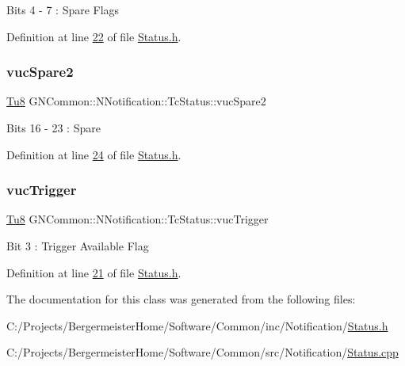 Bits 4 -\/ 7 \+: Spare Flags 

Definition at line \mbox{\hyperlink{_status_8h_source_l00022}{22}} of file \mbox{\hyperlink{_status_8h_source}{Status.\+h}}.

\mbox{\label{class_g_n_common_1_1_n_notification_1_1_tc_status_aaee139b3984634b3cc3cc7e2b7175035}} 
\subsubsection{\texorpdfstring{vuc\+Spare2}{vucSpare2}}
{\footnotesize\ttfamily \mbox{\hyperlink{namespace_g_n_common_a7939e251ddbf5d3a31832dcfdc8bde39}{Tu8}} G\+N\+Common\+::\+N\+Notification\+::\+Tc\+Status\+::vuc\+Spare2}

Bits 16 -\/ 23 \+: Spare 

Definition at line \mbox{\hyperlink{_status_8h_source_l00024}{24}} of file \mbox{\hyperlink{_status_8h_source}{Status.\+h}}.

\mbox{\label{class_g_n_common_1_1_n_notification_1_1_tc_status_a4af337a51278a09d8500bab15d929af3}} 
\subsubsection{\texorpdfstring{vuc\+Trigger}{vucTrigger}}
{\footnotesize\ttfamily \mbox{\hyperlink{namespace_g_n_common_a7939e251ddbf5d3a31832dcfdc8bde39}{Tu8}} G\+N\+Common\+::\+N\+Notification\+::\+Tc\+Status\+::vuc\+Trigger}

Bit 3 \+: Trigger Available Flag 

Definition at line \mbox{\hyperlink{_status_8h_source_l00021}{21}} of file \mbox{\hyperlink{_status_8h_source}{Status.\+h}}.



The documentation for this class was generated from the following files\+:\begin{DoxyCompactItemize}
\item 
C\+:/\+Projects/\+Bergermeister\+Home/\+Software/\+Common/inc/\+Notification/\mbox{\hyperlink{_status_8h}{Status.\+h}}\item 
C\+:/\+Projects/\+Bergermeister\+Home/\+Software/\+Common/src/\+Notification/\mbox{\hyperlink{_status_8cpp}{Status.\+cpp}}\end{DoxyCompactItemize}
